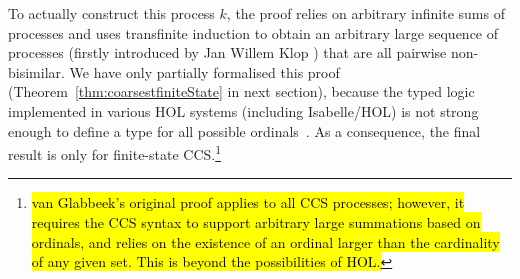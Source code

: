 To actually construct this process $k$,
 the proof relies on arbitrary infinite sums of 
processes and uses transfinite induction to obtain
an arbitrary large sequence of processes (firstly introduced by Jan
Willem Klop \cite{van2005characterisation})
 that are all pairwise non-bisimilar.
We have only partially formalised
this proof (Theorem~\ref{thm:coarsestfiniteState} in next section),
because
the typed logic
implemented in various HOL systems (including Isabelle/HOL) is not
strong enough to define a type for all possible
ordinals~\cite{norrish2013ordinals}.
As a consequence, the final result is only for finite-state
CCS.\footnote{\hl{van Glabbeek's
  original proof applies to all CCS processes; however,  it
  requires the CCS syntax to support arbitrary large summations based
  on ordinals, and relies on the existence  of an
  ordinal larger than the cardinality of any given set. This is beyond
  the possibilities of HOL.}}

